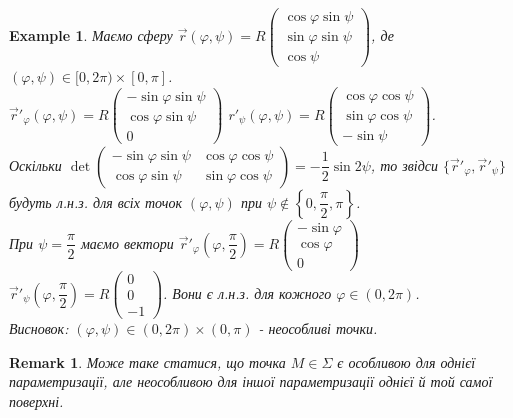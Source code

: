 \documentclass[a4paper, 10pt]{article}
\theoremstyle{theoremdd}
\theoremstyle{theoremdd}
\theoremstyle{theoremdd}
\theoremstyle{theoremdd}
\newtheorem{example}[theorem]{Example}
\theoremstyle{theoremdd}
\theoremstyle{theoremdd}
\newtheorem{remark}[theorem]{Remark}
\theoremstyle{theoremdd}
\theoremstyle{theoremdd}
\begin{document}
\begin{example}
Маємо сферу $\vec{r}(\varphi,\psi) = R \begin{pmatrix}
\cos \varphi \sin \psi \\
\sin \varphi \sin \psi \\
\cos \psi
\end{pmatrix}$, де $(\varphi,\psi) \in [0,2\pi) \times [0,\pi]$.\\
$\vec{r}'_\varphi(\varphi,\psi) = R \begin{pmatrix}
-\sin \varphi \sin \psi \\
\cos \varphi \sin \psi \\
0
\end{pmatrix}$ \hspace{1cm} $r'_\psi(\varphi,\psi) = R \begin{pmatrix}
\cos \varphi \cos \psi \\
\sin \varphi \cos \psi \\
- \sin \psi
\end{pmatrix}$.\\
Оскільки $\det \begin{pmatrix}
-\sin \varphi \sin \psi & \cos \varphi \cos \psi \\
\cos \varphi \sin \psi & \sin \varphi \cos \psi
\end{pmatrix} = -\dfrac{1}{2} \sin 2\psi$, то звідси $\{ \vec{r}'_\varphi, \vec{r}'_\psi \}$ будуть л.н.з. для всіх точок $(\varphi,\psi)$ при $\psi \not\in \left\{ 0, \dfrac{\pi}{2}, \pi \right\}$.\\
При $\psi = \dfrac{\pi}{2}$ маємо вектори $\vec{r}'_\varphi\left(\varphi,\dfrac{\pi}{2} \right) = R \begin{pmatrix}
-\sin \varphi \\ \cos \varphi \\ 0
\end{pmatrix}$ \hspace{1cm} $\vec{r}'_\psi\left(\varphi,\dfrac{\pi}{2} \right) = R \begin{pmatrix}
0 \\ 0 \\ -1
\end{pmatrix}$. Вони є л.н.з. для кожного $\varphi \in (0,2\pi)$.\\
Висновок: $(\varphi,\psi) \in (0,2\pi) \times (0,\pi)$ - неособливі точки.
\end{example}

\begin{remark}
Може таке статися, що точка $M \in \Sigma$ є особливою для однієї параметризації, але неособливою для іншої параметризації однієї й той самої поверхні.
\end{remark}
\end{document}
